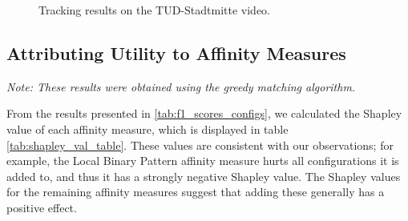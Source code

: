 \documentclass[10pt,twocolumn,letterpaper]{article}
\begin{document}
\begin{figure}[h]
    \centering
    \caption{Tracking results on the TUD-Stadtmitte video.}
    \label{fig:example_frame_train}%
\end{figure}


\subsection{Attributing Utility to Affinity Measures}
\textit{Note: These results were obtained using the greedy matching algorithm.}

From the results presented in \ref{tab:f1_scores_configs}, we calculated the Shapley value of each affinity measure, which is displayed in table \ref{tab:shapley_val_table}.
These values are consistent with our observations; for example, the Local Binary Pattern affinity measure hurts all configurations it is added to, and thus it has a strongly negative Shapley value.
The Shapley values for the remaining affinity measures suggest that adding these generally has a positive effect.
\end{document}
